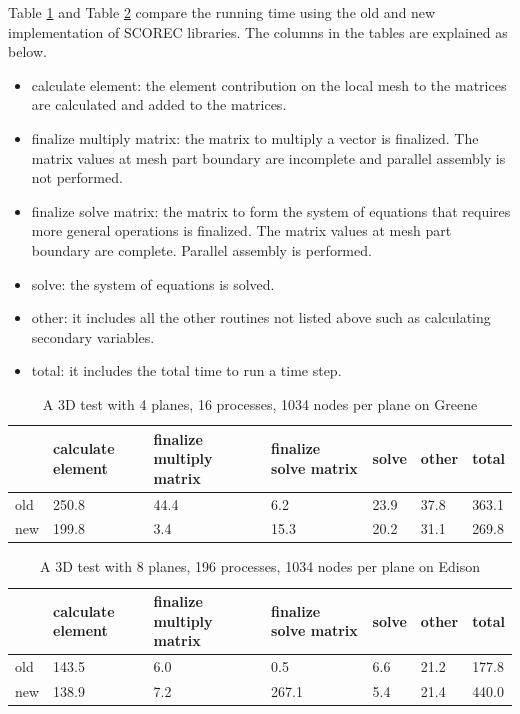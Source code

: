 \documentclass[11pt]{article}  %
\begin{document}
Table \ref{tab:3DGreene} and Table \ref{tab:3DEdison} compare the running time using the old and new implementation of SCOREC libraries. The columns in the tables are explained as below.
\begin{itemize}
\item calculate element: the element contribution on the local mesh to the matrices are calculated and added to the matrices.
\item  finalize multiply matrix: the matrix to multiply a vector is finalized. The matrix values at mesh part boundary are incomplete and parallel assembly is not performed.
\item finalize solve matrix: the matrix to form the system of equations that requires more general operations is finalized. The matrix values at mesh part boundary are complete. Parallel assembly is performed.
\item solve: the  system of equations is solved.
\item other: it includes all the other routines not listed above such as calculating secondary variables.
\item total: it includes the total time to run a time step.
\end{itemize}
 \begin{table}
 \center
  \caption{A 3D test with 4 planes, 16 processes, 1034 nodes per plane on Greene}  \label{tab:3DGreene}
 \begin{tabular}{|l|l|l|l|l|l|l|}
   \hline
    &  calculate element & finalize multiply matrix & finalize solve matrix & solve & other & total  \\ \hline
  old  & 250.8 & 44.4 &  6.2 & 23.9 & 37.8 & 363.1  \\ \hline
  new  & 199.8& 3.4 &  15.3 & 20.2 & 31.1 & 269.8  \\ \hline
   \end{tabular}
\end{table}

 \begin{table}
 \center
  \caption{A 3D test with 8 planes, 196 processes, 1034 nodes per plane on Edison}  \label{tab:3DEdison}
 \begin{tabular}{|l|l|l|l|l|l|l|}
   \hline
    &  calculate element & finalize multiply matrix & finalize solve matrix & solve & other & total  \\ \hline
  old  &143.5 & 6.0 &  0.5 & 6.6 & 21.2 & 177.8  \\ \hline
  new  & 138.9& 7.2 &  267.1 & 5.4 & 21.4 & 440.0  \\ \hline
   \end{tabular}
\end{table}
\end{document}
